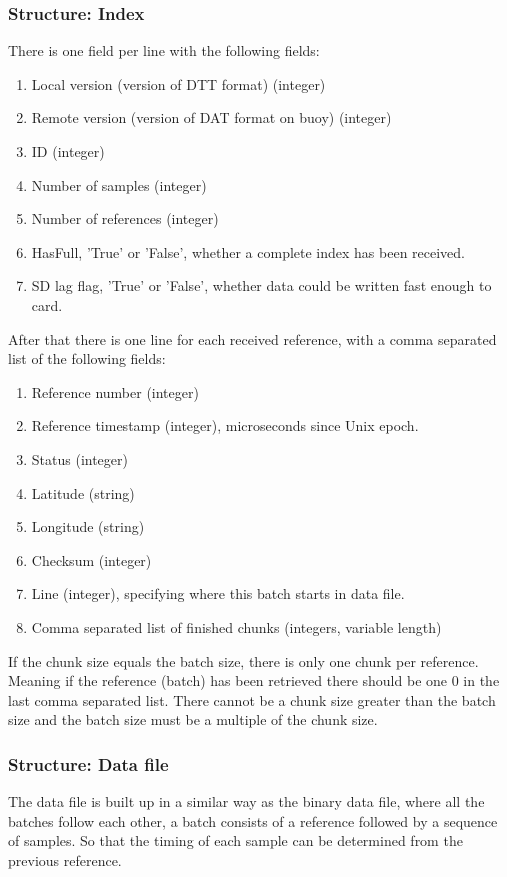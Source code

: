 \documentclass[a4paper]{article}
\begin{document}
\begin{multicols}{2}
  \subsubsection{Structure: Index}
  There is one field per line with the following fields: \\
  \begin{enumerate}
    \item Local version (version of DTT format) (integer)
    \item Remote version (version of DAT format on buoy) (integer)
    \item ID (integer)
    \item Number of samples (integer)
    \item Number of references (integer)
    \item HasFull, 'True' or 'False', whether a complete index has been
      received.
    \item SD lag flag, 'True' or 'False', whether data could be written
      fast enough to card.
  \end{enumerate}

  After that there is one line for each received reference, with a comma
  separated list of the following fields: \\
  \begin{enumerate}
    \item Reference number (integer)
    \item Reference timestamp (integer), microseconds since Unix epoch.
    \item Status (integer)
    \item Latitude  (string)
    \item Longitude (string)
    \item Checksum (integer)
    \item Line (integer), specifying where this batch starts in data file.
    \item Comma separated list of finished chunks (integers, variable
      length)
  \end{enumerate}

  If the chunk size equals the batch size, there is only one chunk per
  reference. Meaning if the reference (batch) has been retrieved there
  should be one 0 in the last comma separated list. There cannot be a
  chunk size greater than the batch size and the batch size must be a
  multiple of the chunk size.

  \subsubsection{Structure: Data file}
  The data file is built up in a similar way as the binary data file,
  where all the batches follow each other, a batch consists of a
  reference followed by a sequence of samples. So that the timing of
  each sample can be determined from the previous reference.


\end{multicols}
\end{document}
